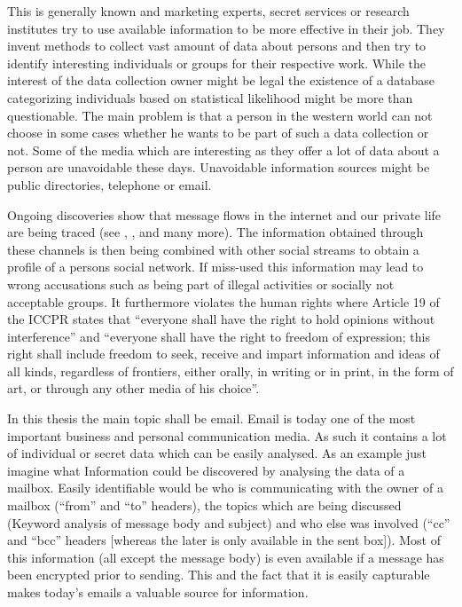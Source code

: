 \documentclass[twocolumn,a4paper,10pt,english]{article}
\begin{document}
This is generally known and marketing experts, secret services or research institutes try to use available information to be more effective in their job. They invent methods to collect vast amount of data about persons and then try to identify interesting individuals or groups for their respective work. While the interest of the data collection owner might be legal the existence of a database categorizing individuals based on statistical likelihood might be more than questionable. The main problem is that a person in the western world can not choose in some cases whether he wants to be part of such a data collection or not. Some of the media which are interesting as they offer a lot of data about a person are unavoidable these days. Unavoidable information sources might be public directories, telephone or email.\par

Ongoing discoveries show that message flows in the internet and our private life are being traced (see \cite{ECHELON}, \cite{wiki:prism}, \cite{wiki:tempora} and many more). The information obtained through these channels is then being combined with other social streams to obtain a profile of a persons social network. If miss-used this information may lead to wrong accusations such as being part of illegal activities or socially not acceptable groups. It furthermore violates the human rights where Article 19 of the ICCPR states that ``everyone shall have the right to hold opinions without interference'' and ``everyone shall have the right to freedom of expression; this right shall include freedom to seek, receive and impart information and ideas of all kinds, regardless of frontiers, either orally, in writing or in print, in the form of art, or through any other media of his choice''\cite{iccpr}.\par

In this thesis the main topic shall be email. Email is today one of the most important business and personal communication media. As such it contains a lot of individual or secret data which can be easily analysed. As an example just imagine what Information could be discovered by analysing the data of a mailbox. Easily identifiable would be who is communicating with the owner of a mailbox (``from'' and ``to'' headers), the topics which are being discussed (Keyword analysis of message body and subject) and who else was involved (``cc'' and ``bcc'' headers [whereas the later is only available in the sent box]). Most of this information (all except the message body) is even available if a message has been encrypted prior to sending. This and the fact that it is easily capturable makes today’s emails a valuable source for information.\par
\end{document}

